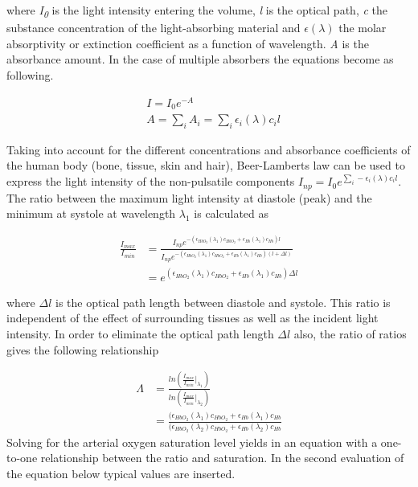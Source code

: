\documentclass{report}
\begin{document}
\noindent
where  \emph{I\textsubscript{0}} is the light intensity entering the volume, \emph{l} is the optical path, \emph{c} the substance concentration of the light-absorbing material and $\epsilon(\lambda)$ the molar absorptivity or extinction coefficient as a function of wavelength.  \emph{A} is the absorbance amount. In the case of multiple absorbers the equations become as following.

 \begin{equation}
\begin{split}
& I = I_{0}e^{-A} \\
& A = \sum\limits_{i} A_{i} = \sum\limits_{i} \epsilon_{i}(\lambda) c_{i} l
\end{split}
\end{equation}

\noindent
Taking into account for the different concentrations and absorbance coefficients of the human body (bone, tissue, skin and hair), Beer-Lamberts law can be used to express the light intensity of the non-pulsatile components $I_{np} =  I_{0}e^{\sum\limits_{i}-\epsilon_{i}(\lambda) c_{i} l}$.
The ratio between the maximum light intensity at diastole (peak) and the minimum at systole at wavelength $\lambda_{1}$ is calculated as

 \begin{equation}
\begin{split}
\frac{I_{max}}{I_{min}} & =\frac{ I_{np}e^{-(\epsilon_{HbO_{2}}(\lambda_{1}) c_{HbO_{2}}+\epsilon_{Hb}(\lambda_{1}) c_{Hb}) l}}{ I_{np}e^{-(\epsilon_{HbO_{2}}(\lambda_{1}) c_{HbO_{2}}+\epsilon_{Hb}(\lambda_{1}) c_{Hb})(l+\Delta l)}} \\
& = e^{(\epsilon_{HbO_{2}}(\lambda_{1}) c_{HbO_{2}}+\epsilon_{Hb}(\lambda_{1}) c_{Hb}) \Delta l}
\end{split}
\end{equation}

\noindent
where $\Delta l$ is the optical path length between diastole and systole.  This ratio is independent of the effect of surrounding tissues as well as the incident light intensity. In order to eliminate the optical path length $\Delta l$ also, the ratio of ratios gives the following relationship


 \begin{equation}
\begin{split}
\Lambda & = \frac{ln(\frac{I_{max}}{I_{min}} |_{\lambda_{1}})}{ ln(\frac{I_{max}}{I_{min}} |_{\lambda_{2}}) } \\
& = \frac{(\epsilon_{HbO_{2}}(\lambda_{1}) c_{HbO_{2}}+\epsilon_{Hb}(\lambda_{1}) c_{Hb}}{(\epsilon_{HbO_{2}}(\lambda_{2}) c_{HbO_{2}}+\epsilon_{Hb}(\lambda_{2}) c_{Hb}}
\end{split}
\end{equation}
\noindent
Solving for the arterial oxygen saturation level yields in an equation with a one-to-one relationship between the ratio and saturation. In the second evaluation of the equation below typical values are inserted.
\end{document}

